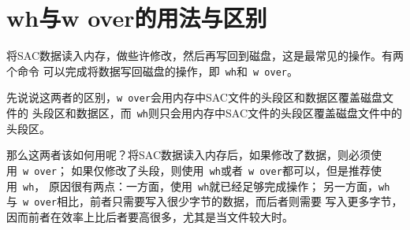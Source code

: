 \section{wh与w over的用法与区别}
将SAC数据读入内存，做些许修改，然后再写回到磁盘，这是最常见的操作。有两个命令
可以完成将数据写回磁盘的操作，即~\verb+wh+和~\verb+w over+。

先说说这两者的区别，\verb+w over+会用内存中SAC文件的头段区和数据区覆盖磁盘文件的
头段区和数据区，而~\verb+wh+则只会用内存中SAC文件的头段区覆盖磁盘文件中的头段区。

那么这两者该如何用呢？将SAC数据读入内存后，如果修改了数据，则必须使用~\verb+w over+；
如果仅修改了头段，则使用~\verb+wh+或者~\verb+w over+都可以，但是推荐使用~\verb+wh+，
原因很有两点：一方面，使用~\verb+wh+就已经足够完成操作；
另一方面，\verb+wh+与~\verb+w over+相比，前者只需要写入很少字节的数据，而后者则需要
写入更多字节，因而前者在效率上比后者要高很多，尤其是当文件较大时。
